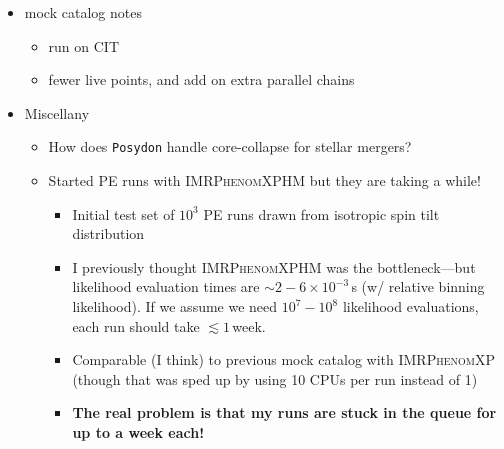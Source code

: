 \documentclass[
    aps,
    prd,
    reprint,
    onecolumn,
    superscriptaddress,
    linenumbers,
    nolongbibliography,
    nobibnotes,
    nofootinbib,
]{revtex4-2}
\begin{document}
\begin{itemize}
    \item mock catalog notes
    \begin{itemize}
        \item run on CIT
        \item fewer live points, and add on extra parallel chains
        
    \end{itemize}

    \item Miscellany
    \begin{itemize}
        \item How does \texttt{Posydon} handle core-collapse for stellar mergers?
        \item Started PE runs with \textsc{IMRPhenomXPHM} but they are taking a while!
        \begin{itemize}
            \item Initial test set of $10^3$ PE runs drawn from isotropic spin tilt distribution
            \item I previously thought \textsc{IMRPhenomXPHM} was the bottleneck---but likelihood evaluation times are $\sim 2 - 6 \times 10^{-3}$\,s (w/ relative binning likelihood).
            If we assume we need $10^7 - 10^8$ likelihood evaluations, each run should take $\lesssim 1$\,week.
            \item Comparable (I think) to previous mock catalog with \textsc{IMRPhenomXP} (though that was sped up by using 10 CPUs per run instead of 1)
            \item \textbf{The real problem is that my runs are stuck in the queue for up to a week each!}
        \end{itemize}
    \end{itemize}
\end{itemize}
\end{document}

